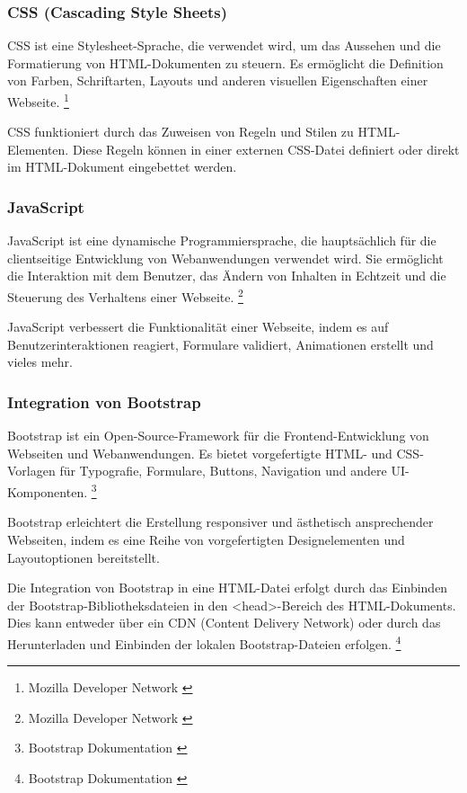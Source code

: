 \subsubsection*{CSS (Cascading Style Sheets)}
CSS ist eine Stylesheet-Sprache, die verwendet wird, um das Aussehen und die Formatierung von HTML-Dokumenten zu steuern.
Es ermöglicht die Definition von Farben, Schriftarten, Layouts und anderen visuellen Eigenschaften einer Webseite. \footnote{Mozilla Developer Network \cite{CSS}}

CSS funktioniert durch das Zuweisen von Regeln und Stilen zu HTML-Elementen. Diese Regeln können in einer externen
CSS-Datei definiert oder direkt im HTML-Dokument eingebettet werden.

\subsubsection*{JavaScript}
JavaScript ist eine dynamische Programmiersprache, die hauptsächlich für die clientseitige Entwicklung von Webanwendungen
verwendet wird. Sie ermöglicht die Interaktion mit dem Benutzer, das Ändern von Inhalten in Echtzeit und die Steuerung
des Verhaltens einer Webseite. \footnote{Mozilla Developer Network \cite{Javascript}}

JavaScript verbessert die Funktionalität einer Webseite, indem es auf Benutzerinteraktionen reagiert, Formulare validiert,
Animationen erstellt und vieles mehr.

\subsubsection*{Integration von Bootstrap}
Bootstrap ist ein Open-Source-Framework für die Frontend-Entwicklung von Webseiten und Webanwendungen. Es bietet
vorgefertigte HTML- und CSS-Vorlagen für Typografie, Formulare, Buttons, Navigation und andere UI-Komponenten. \footnote{Bootstrap Dokumentation \cite{Bootstrap}}

Bootstrap erleichtert die Erstellung responsiver und ästhetisch ansprechender Webseiten, indem es eine Reihe von
vorgefertigten Designelementen und Layoutoptionen bereitstellt.

Die Integration von Bootstrap in eine HTML-Datei erfolgt durch das Einbinden der Bootstrap-Bibliotheksdateien in den
<head>-Bereich des HTML-Dokuments. Dies kann entweder über ein CDN (Content Delivery Network) oder durch das Herunterladen
und Einbinden der lokalen Bootstrap-Dateien erfolgen. \footnote{Bootstrap Dokumentation \cite{CDN-Links}}

